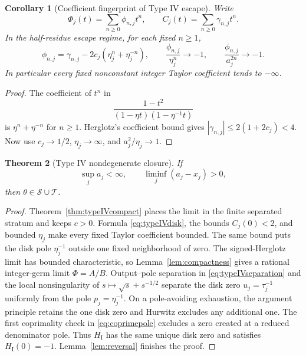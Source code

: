 \documentclass[11pt,reqno]{amsart}
\newtheorem{theorem}{Theorem}[section]
\newtheorem{corollary}[theorem]{Corollary}
\theoremstyle{definition}
\theoremstyle{remark}
\newcommand{\calS}{\mathcal S}
\newcommand{\calT}{\mathcal T}
\begin{document}
\begin{corollary}[Coefficient fingerprint of Type IV escape]
\label{cor:IVfingerprint}
Write
\[
 \Phi_j(t)=\sum_{n\ge0}\phi_{n,j}t^n,
 \qquad C_j(t)=\sum_{n\ge0}\gamma_{n,j}t^n.
\]
In the half-residue escape regime, for each fixed $n\ge1$,
\begin{equation}\label{eq:escape-coefficients}
 \phi_{n,j}=\gamma_{n,j}-2c_j(\eta_j^n+\eta_j^{-n}),
 \qquad
 \frac{\phi_{n,j}}{\eta_j^n}\longrightarrow-1,
 \qquad
 \frac{\phi_{n,j}}{a_j^{2n}}\longrightarrow-1.
\end{equation}
In particular every fixed nonconstant integer Taylor coefficient tends to
$-\infty$.
\end{corollary}

\begin{proof}
The coefficient of $t^n$ in
\[
 \frac{1-t^2}{(1-\eta t)(1-\eta^{-1}t)}
\]
is $\eta^n+\eta^{-n}$ for $n\ge1$.  Herglotz's coefficient bound gives
$|\gamma_{n,j}|\le2(1+2c_j)<4$.  Now use
$c_j\to1/2$, $\eta_j\to\infty$, and $a_j^2/\eta_j\to1$.
\end{proof}

\begin{theorem}[Type IV nondegenerate closure]\label{thm:typeIVclosure}
If
\begin{equation}\label{eq:typeIVseparation}
 \sup_j a_j<\infty,\qquad
 \liminf_j(a_j-x_j)>0,
\end{equation}
then $\theta\in\calS\cup\calT$.
\end{theorem}

\begin{proof}
Theorem~\ref{thm:typeIVcompact} places the limit in the finite separated
stratum and keeps $c>0$.  Formula \eqref{eq:typeIVdisk}, the bounds
$C_j(0)<2$, and bounded $\eta_j$ make every fixed Taylor coefficient bounded.
The same bound puts the disk pole $\eta_j^{-1}$ outside one fixed
neighborhood of zero.  The signed-Herglotz limit has bounded characteristic,
so Lemma~\ref{lem:compactness} gives a rational integer-germ limit
$\Phi=A/B$.  Output--pole separation in \eqref{eq:typeIVseparation} and
the local nonsingularity of $s\mapsto\sqrt s+s^{-1/2}$ separate the disk
zero $u_j=\tau_j^{-1}$ uniformly from the pole $p_j=\eta_j^{-1}$.  On a
pole-avoiding exhaustion, the argument principle retains the one disk zero
and Hurwitz excludes any additional one.  The first coprimality check in
\eqref{eq:coprimepole} excludes a zero created at a reduced denominator
pole.  Thus $H_{\mathrm I}$ has the same unique disk zero and satisfies
$H_{\mathrm I}(0)=-1$.
Lemma~\ref{lem:reversal} finishes the proof.
\end{proof}
\end{document}
